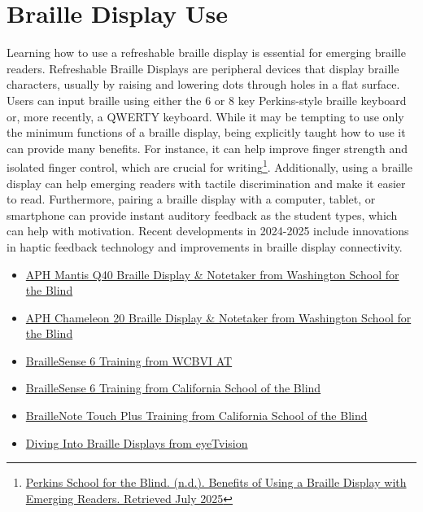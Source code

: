 \begin{itemize}
\begin{itemize}
\hypertarget{appx10}{}\section[Braille Display Use]{Braille Display Use}\label{appx10}
Learning how to use a refreshable braille display is essential for emerging braille readers. Refreshable Braille Displays are peripheral devices that display braille characters, usually by raising and lowering dots through holes in a flat surface. Users can input braille using either the 6 or 8 key Perkins-style braille keyboard or, more recently, a QWERTY keyboard. While it may be tempting to use only the minimum functions of a braille display, being explicitly taught how to use it can provide many benefits. For instance, it can help improve finger strength and isolated finger control, which are crucial for writing\footnote{\raggedright \href{https://www.perkins.org/resource/benefits-using-braille-display-emerging-readers/}{Perkins School for the Blind. (n.d.). Benefits of Using a Braille Display with Emerging Readers. Retrieved July 2025}}. Additionally, using a braille display can help emerging readers with tactile discrimination and make it easier to read. Furthermore, pairing a braille display with a computer, tablet, or smartphone can provide instant auditory feedback as the student types, which can help with motivation. Recent developments in 2024-2025 include innovations in haptic feedback technology and improvements in braille display connectivity.
\begin{itemize}
\item \href{https://view.officeapps.live.com/op/view.aspx?src=https\%3A\%2F\%2Fwww.wssb.wa.gov\%2Fsites\%2Fdefault\%2Ffiles\%2F2021-10\%2FUsing\%2520APH\%2520Mantis\%2520Q40.docx&wdOrigin=BROWSELINK}{APH Mantis Q40 Braille Display \& Notetaker from Washington School for the Blind}
\item \href{https://view.officeapps.live.com/op/view.aspx?src=https\%3A\%2F\%2Fwww.wssb.wa.gov\%2Fsites\%2Fdefault\%2Ffiles\%2F2023-07\%2FUsing\%2520APH\%2520Chameleon\%252020.docx&wdOrigin=BROWSELINK}{APH Chameleon 20 Braille Display \& Notetaker from Washington School for the Blind}
\item \href{https://drive.google.com/drive/folders/1V\_hXjrsDeKUbNImA6Q77joADQbqMKKKl}{BrailleSense 6 Training from WCBVI AT}
\item \href{https://drive.google.com/drive/folders/10HeixUb4E21nPLCStmnrsxLVehKThPP}{BrailleSense 6 Training from California School of the Blind}
\item \href{https://drive.google.com/drive/folders/1OKBBdjbbD6asrE4dYyP7do9EWvY--5wf}{BrailleNote Touch Plus Training from California School of the Blind}
\item \href{https://eyetvision.org/}{Diving Into Braille Displays from eyeTvision}
\end{itemize}


\end{itemize}
\end{itemize}
